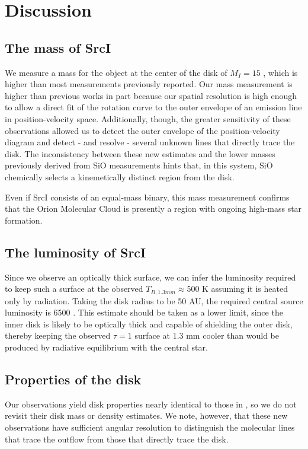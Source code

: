 \documentclass[twocolumn]{aastex61}
\newcommand{\sourcei}{SrcI\xspace}
\begin{document}
\section{Discussion}
\label{sec:discussion}
\subsection{The mass of \sourcei}
We measure a mass for the object at the center of the disk of $M_I=15$
\msun, which is higher than most measurements previously reported.  Our mass
measurement is higher than previous works in part because our spatial
resolution is high enough to allow a direct fit of the rotation curve to the
outer envelope of an emission line in position-velocity space.
Additionally, though, the greater sensitivity of these observations allowed
us to detect the outer envelope of the \water position-velocity diagram
and detect - and resolve - several unknown lines that directly trace the disk.
The inconsistency between these new estimates and the lower masses previously
derived from SiO measurements hints that, in this system, SiO chemically
selects a kinemetically distinct region from the disk.

Even if \sourcei consists of an equal-mass binary, this mass measurement
confirms that the Orion Molecular Cloud is presently a region with ongoing
high-mass star formation.

\subsection{The luminosity of \sourcei}
Since we observe an optically thick surface, we can infer the luminosity
required to keep such a surface at the observed $T_{B,1.3 mm}\approx$500 K assuming
it is heated only by radiation.  Taking the disk radius to be 50 AU,
the required central source luminosity is 6500 \lsun.  This estimate
should be taken as a lower limit, since the inner disk is likely to be
optically thick and capable of shielding the outer disk, thereby
keeping the observed $\tau=1$ surface at 1.3 mm cooler than would
be produced by radiative equilibrium with the central star.

\subsection{Properties of the disk}
Our observations yield disk properties nearly identical to those in
\citet{Plambeck2016a}, so we do not revisit their disk mass or density
estimates.  We note, however, that these new observations have sufficient
angular resolution to distinguish the molecular lines that trace the outflow
from those that directly trace the disk.
\end{document}
